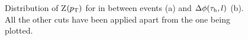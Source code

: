 \begin{figure}[ht]
	\centering
	\hfill
	\hfill
	\caption{Distribution of Z$(p_\text{T})$ for in between events (a) and $\Delta\phi(\tau_\text{h},l)$ (b). All the other cuts have been applied apart from the one being plotted.}
	\label{Fig22}
\end{figure}